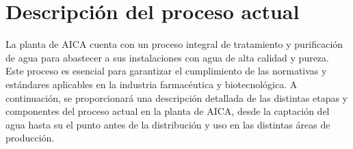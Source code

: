 \section{Descripción del proceso actual}

La planta de AICA cuenta con un proceso integral de tratamiento y purificación de agua para abastecer
a sus instalaciones con agua de alta calidad y pureza. Este proceso es esencial para garantizar
el cumplimiento de las normativas y estándares aplicables en la industria farmacéutica y biotecnológica.
A continuación, se proporcionará una descripción detallada de las distintas etapas y componentes del
proceso actual en la planta de AICA, desde la captación del agua hasta su el punto antes de la distribución y uso en las distintas áreas de producción.


